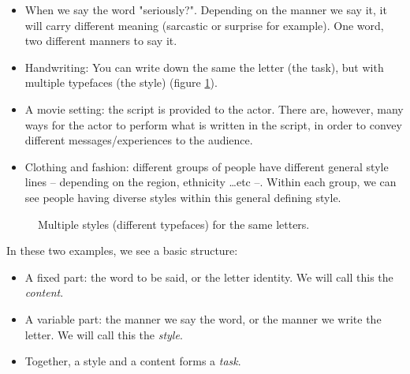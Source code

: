   \begin{itemize}
    \item When we say the word "seriously?". Depending on the manner we say it, it will carry different meaning (sarcastic or surprise for example). One word, two different manners to say it.
    \item Handwriting: You can write down the same the letter (the task), but with multiple typefaces (the style) (figure \ref{fig:different_fonts}).
    \item A movie setting: the script is provided to the actor. There are, however, many ways for the actor to perform what is written in the script, in order to convey different messages/experiences to the audience.
    \item Clothing and fashion: different groups of people have different general style lines -- depending on the region, ethnicity \dots etc --. Within each group, we can see people having diverse styles within this general defining style.
  \end{itemize}

  \begin{figure}[!htbp]
    \begin{center}
    \end{center}
    \caption{Multiple styles (different typefaces) for the same letters.}
    \label{fig:different_fonts}
  \end{figure}

  In these two examples, we see a basic structure:
  \begin{itemize}
    \item A fixed part: the word to be said, or the letter identity. We will call this the \textit{content}.
    \item A variable part: the manner we say the word, or the manner we write the letter. We will call this the \textit{style}.
    \item Together, a style and a content forms a \textit{task}.
  \end{itemize}

